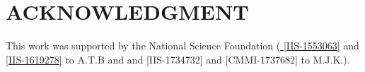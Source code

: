 \documentclass[letterpaper, 10 pt, conference]{ieeeconf}  %
\begin{document}
\section*{ACKNOWLEDGMENT}
%
This work was supported by the National Science Foundation (\href{http://nsf.gov/awardsearch/showAward?AWD_ID=1553063}{ [IIS-1553063]} and \href{http://nsf.gov/awardsearch/showAward?AWD_ID=1619278}{[IIS-1619278]} to A.T.B and
and [IIS-1734732] and [CMMI-1737682] to M.J.K.).








\end{document}
